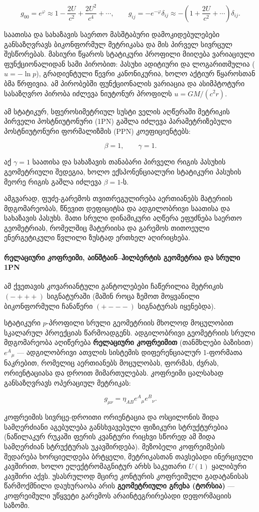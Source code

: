 \documentclass[11pt,a4paper]{article}
\begin{document}
\[
g_{00} = e^\varphi \approx 1 - \frac{2U}{c^2} + \frac{2U^2}{c^4} + \cdots, \qquad g_{ij} = -e^{-\varphi}\delta_{ij} \approx -\left(1 + \frac{2U}{c^2} + \cdots\right)\delta_{ij}.
\]

საათისა და სახაზავის საერთო მასშტაბური დამოკიდებულებები განსაზღვრავს ბიკონფორმულ მეტრიკასა და მის პირველ სივრცულ შესწორებას. მასიური წყაროს სტატიკური პროფილი მიიღება ვარიაციული ფუნქციონალიდან სამი პირობით: პასუხი ადიტიური და ლოგარითმულია ($u=-\ln p$), გრადიენტული წევრი კანონიკურია, ხოლო აქტიურ წყაროსთან ბმა წრფივია. ამ პირობებში ფუნქციონალის ვარიაცია და ასიმპტოტური სასაზღვრო პირობა იძლევა ნიუტონურ პროფილს $u=GM/(c^2r)$.

ამ სტატიკურ, სფეროსიმეტრიულ სუსტი ველის აღწერაში მეტრიკის პირველი პოსტნიუტონური (1PN) გაშლა იძლევა პარამეტრიზებული პოსტნიუტონური ფორმალიზმის (PPN) კოეფიციენტებს:

\[
\beta = 1, \qquad \gamma = 1.
\]

აქ $\gamma=1$ საათისა და სახაზავის თანაბარი პირველი რიგის პასუხის გეომეტრიული შედეგია, ხოლო ექსპონენციალური სტატიკური პასუხის მეორე რიგის გაშლა იძლევა $\beta=1$-ს.

ამგვარად, ფუძე-გარემოს თვითრეგულირება აერთიანებს მატერიის მდგომარეობას, წნევით დეფიციტსა და ადგილობრივი საათისა და სახაზავის პასუხს. მათი სრული დინამიკური აღწერა ეფუძნება საერთო გეომეტრიას, რომელშიც მატერიისა და გარემოს თითოეული ენერგეტიკული წვლილი ზუსტად ერთხელ აღირიცხება.

\paragraph{რელაციური კოფრეიმი, აინშტაინ–ჰილბერტის გეომეტრია და სრული 1PN}

ამ ქვეთავის კოვარიანტული განტოლებები ჩაწერილია მეტრიკის $(-+++)$ სიგნატურაში (მაშინ როცა ზემოთ მოყვანილი ბიკონფორმული ჩანაწერი $(+---)$ სიგნატურას იყენებდა).

სტატიკური $p$-პროფილი სრული გეომეტრიის მხოლოდ მოცულობით სკალარულ პროექციას წარმოადგენს. ადგილობრივი გეომეტრიის სრული მდგომარეობა აღიწერება \textbf{რელაციური კოფრეიმით} (თანმხლები ბაზისით) $e^A{}_\mu$ — ადგილობრივი ათვლის სისტემის დიფერენციალურ 1-ფორმათა ნაკრებით, რომელიც აერთიანებს მოცულობას, ფორმას, ძვრას, ორიენტაციასა და დროით მიმართულებას. კოფრეიმი ცალსახად განსაზღვრავს ოპერაციულ მეტრიკას:

\[
g_{\mu\nu}=\eta_{AB}e^A{}_\mu e^B{}_\nu.
\]

კოფრეიმის სივრცე-დროითი ორიენტაცია და ოსცილონის შიდა სამღერძიანი აგებულება განსხვავებული ფიზიკური სტრუქტურებია (ნაწილაკურ რუკაში ფერის კვანტური რიცხვი სწორედ ამ შიდა სამღერძიან სტრუქტურას უკავშირდება). მეზობელი კოფრეიმების შედარება ხორციელდება ბრტყელი, მეტრიკასთან თავსებადი ინერციული კავშირით, ხოლო ელექტრომაგნიტურ არხს საკუთარი $U(1)$ ყალიბური კავშირი აქვს. უსასრულოდ მცირე კონტურის კოფრეიმული გადატანისას წარმოქმნილი დაუხურაობა არის \textbf{გეომეტრიული გრეხა (ტორსია)} — კოფრეიმული უწყვეტი გარემოს არაინტეგრირებადი დეფორმაციის საზომი.
\end{document}

